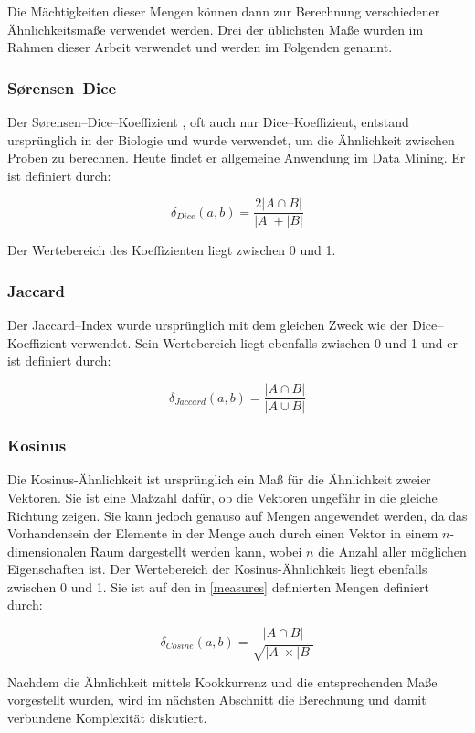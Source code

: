 Die Mächtigkeiten dieser Mengen können dann zur Berechnung verschiedener Ähnlichkeitsmaße verwendet werden. Drei der üblichsten Maße wurden im Rahmen dieser Arbeit verwendet und werden im Folgenden genannt.

\subsubsection{Sørensen--Dice}

Der Sørensen--Dice--Koeffizient \cite{st1948} \cite{ld1945}, oft auch nur Dice--Koeffizient, entstand ursprünglich in der Biologie und wurde verwendet, um die Ähnlichkeit zwischen Proben zu berechnen. Heute findet er allgemeine Anwendung im Data Mining. Er ist definiert durch:

\[
\delta_{Dice}(a, b) = \frac{2|A \cap B|}{|A|+|B|}
\]

Der Wertebereich des Koeffizienten liegt zwischen \num{0} und \num{1}.

\subsubsection{Jaccard}

Der Jaccard--Index \cite{pj19012} wurde ursprünglich mit dem gleichen Zweck wie der Dice--Koeffizient verwendet. Sein Wertebereich liegt ebenfalls zwischen \num{0} und \num{1} und er ist definiert durch:

\[
\delta_{Jaccard}(a,b) = \frac{|A \cap B|}{|A \cup B|}
\]

\subsubsection{Kosinus}

Die Kosinus-Ähnlichkeit \cite{hkp2012} ist ursprünglich ein Maß für die Ähnlichkeit zweier Vektoren. Sie ist eine Maßzahl dafür, ob die Vektoren ungefähr in die gleiche Richtung zeigen. Sie kann jedoch genauso auf Mengen angewendet werden, da das Vorhandensein der Elemente in der Menge auch durch einen Vektor in einem \(n\)-dimensionalen Raum dargestellt werden kann, wobei \(n\) die Anzahl aller möglichen Eigenschaften ist. Der Wertebereich der Kosinus-Ähnlichkeit liegt ebenfalls zwischen \num{0} und \num{1}. Sie ist auf den in \cref{measures} definierten Mengen definiert durch:

\[
\delta_{Cosine}(a, b) = \frac{|A \cap B|}{\sqrt{|A| \times |B|}}
\]

Nachdem die Ähnlichkeit mittels Kookkurrenz und die entsprechenden Maße vorgestellt wurden, wird im nächsten Abschnitt die Berechnung und damit verbundene Komplexität diskutiert.

